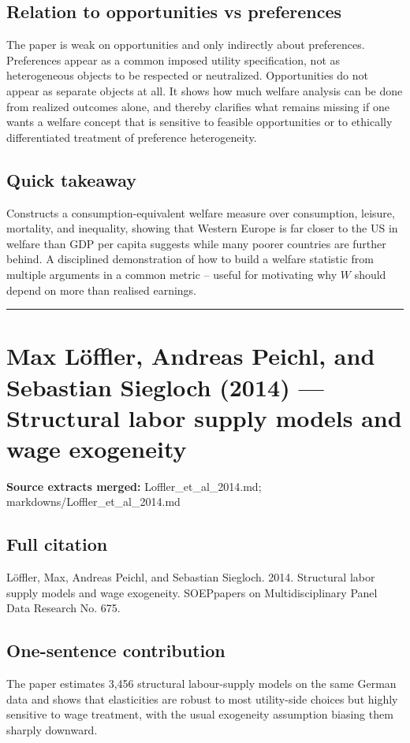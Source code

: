 \documentclass[11pt,a4paper]{article}
\begin{document}
\subsection*{Relation to opportunities vs preferences}
The paper is weak on opportunities and only indirectly about preferences. Preferences appear as a common imposed utility specification, not as heterogeneous objects to be respected or neutralized. Opportunities do not appear as separate objects at all. It shows how much welfare analysis can be done from realized outcomes alone, and thereby clarifies what remains missing if one wants a welfare concept that is sensitive to feasible opportunities or to ethically differentiated treatment of preference heterogeneity.

\subsection*{Quick takeaway}
Constructs a consumption-equivalent welfare measure over consumption, leisure, mortality, and inequality, showing that Western Europe is far closer to the US in welfare than GDP per capita suggests while many poorer countries are further behind. A disciplined demonstration of how to build a welfare statistic from multiple arguments in a common metric -- useful for motivating why $W$ should depend on more than realised earnings.


\medskip\hrule\medskip

\section*{Max Löffler, Andreas Peichl, and Sebastian Siegloch (2014) — Structural labor supply models and wage exogeneity}

\textbf{Source extracts merged:} Loffler\_et\_al\_2014.md; markdowns/Loffler\_et\_al\_2014.md

\subsection*{Full citation}
Löffler, Max, Andreas Peichl, and Sebastian Siegloch. 2014. Structural labor supply models and wage exogeneity. SOEPpapers on Multidisciplinary Panel Data Research No. 675.

\subsection*{One-sentence contribution}
The paper estimates 3,456 structural labour-supply models on the same German data and shows that elasticities are robust to most utility-side choices but highly sensitive to wage treatment, with the usual exogeneity assumption biasing them sharply downward.
\end{document}
